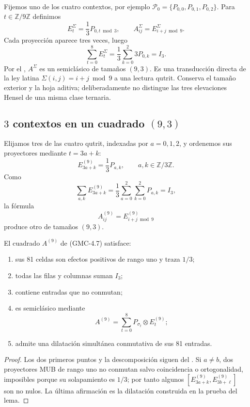 Fijemos uno de los cuatro contextos, por ejemplo
$\mathcal P_0=\{P_{0,0},P_{0,1},P_{0,2}\}$. Para $t\in\mathbb Z/9\mathbb Z$
definimos
\[
 E_t^{\Sigma}=\frac13P_{0,t\bmod3},
 \qquad
 A_{ij}^{\Sigma}=E_{i+j\bmod9}^{\Sigma}.
 \tag{GMC-4.5}
\]
Cada proyección aparece tres veces, luego
\[
 \sum_{t=0}^{8}E_t^{\Sigma}
 =\frac13\sum_{k=0}^2 3P_{0,k}=I_3.
\]
Por el , $A^\Sigma$ es un \QMS semiclásico de tamaños
$(9,3)$. Es una transducción directa de la ley latina
$\Sigma(i,j)=i+j\bmod9$ a una lectura qutrit. Conserva el tamaño exterior y
la hoja aditiva; deliberadamente no distingue las tres elevaciones Hensel de
una misma clase ternaria.

\subsection{\(3\) contextos en un cuadrado $(9,3)$}

Elijamos tres de las cuatro \PVM qutrit, indexadas por $a=0,1,2$, y ordenemos
sus proyectores mediante $t=3a+k$:
\[
 E_{3a+k}^{(9)}=\frac13P_{a,k},
 \qquad a,k\in\mathbb Z/3\mathbb Z.
 \tag{GMC-4.6}
\]
Como
\[
 \sum_{a,k}E_{3a+k}^{(9)}
 =\frac13\sum_{a=0}^2\sum_{k=0}^2P_{a,k}=I_3,
\]
la fórmula
\[
 A_{ij}^{(9)}=E_{i+j\bmod9}^{(9)}
 \tag{GMC-4.7}
\]
produce otro \QMS de tamaños $(9,3)$.

\begin{theorem}
\label{p12-83-c22-s3:gmc:thm:qms-9-3}
El cuadrado $A^{(9)}$ de \textup{(GMC-4.7)} satisface:

\begin{enumerate}
 \item sus 81 celdas son efectos positivos de rango uno y traza $1/3$;
 \item todas las filas y columnas suman $I_3$;
 \item contiene entradas que no conmutan;
 \item es semiclásico mediante
 \[
 A^{(9)}=\sum_{t=0}^{8}P_{\sigma_t}\otimes E_t^{(9)};
 \tag{GMC-4.8}
 \]
 \item admite una dilatación simultánea conmutativa de sus 81
 entradas.
\end{enumerate}
\end{theorem}

\begin{proof}
Los dos primeros puntos y la descomposición siguen del
. Si $a\ne b$, dos proyectores MUB de rango uno no
conmutan salvo coincidencia o ortogonalidad, imposibles porque su solapamiento
es $1/3$; por tanto algunos
$[E_{3a+k}^{(9)},E_{3b+\ell}^{(9)}]$ son no nulos. La última afirmación es la
dilatación construida en la prueba del lema.
\end{proof}

